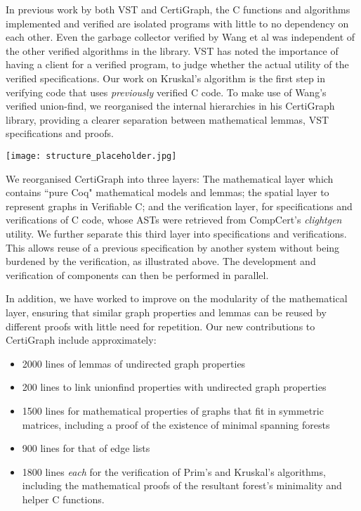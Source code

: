 In previous work by both VST and CertiGraph, the C functions and algorithms implemented and verified are isolated programs with little to no dependency on each other. Even the garbage collector verified by Wang et al\cite{DBLP:journals/pacmpl/WangCMH19} was independent of the other verified algorithms in the library. VST has noted the importance of having a client for a verified program, to judge whether the actual utility of the verified specifications\cite{DBLP:conf/iwmm/AppelN20}. Our work on Kruskal's algorithm is the first step in verifying code that uses \textit{previously} verified C code. To make use of Wang's verified union-find, we reorganised the internal hierarchies in his CertiGraph library, providing a clearer separation between mathematical lemmas, VST specifications and proofs.

\texttt{[image: structure\_placeholder.jpg]}

We reorganised CertiGraph into three layers: The mathematical layer which contains ``pure Coq" mathematical models and lemmas; the spatial layer to represent graphs in Verifiable C; and the verification layer, for specifications and verifications of C code, whose ASTs were retrieved from CompCert's \textit{clightgen} utility. We further separate this third layer into specifications and verifications. This allows reuse of a previous specification by another system without being burdened by the verification, as illustrated above. The development and verification of components can then be performed in parallel.

In addition, we have worked to improve on the modularity of the mathematical layer, ensuring that similar graph properties and lemmas can be reused by different proofs with little need for repetition. Our new contributions to CertiGraph include approximately:
\begin{itemize}
\item2000 lines of lemmas of undirected graph properties
\item200 lines to link unionfind properties with undirected graph properties
\item1500 lines for mathematical properties of graphs that fit in symmetric matrices, including a proof of the existence of minimal spanning forests
\item900 lines for that of edge lists
\item1800 lines \textit{each} for the verification of Prim's and Kruskal's algorithms, including the mathematical proofs of the resultant forest's minimality and helper C functions.
\end{itemize}